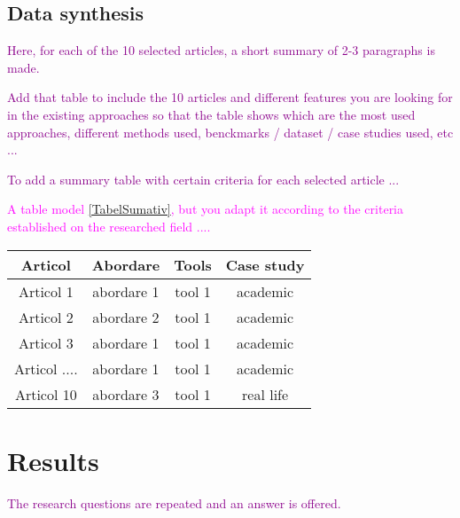 \documentclass[a4paper,fleqn]{cas-dc}
\begin{document}
\subsection{Data synthesis}
\label{SectiuneSintezaArticole}

\textcolor{darkmagenta}{Here, for each of the 10 selected articles, a short summary of 2-3 paragraphs is made.} 


\textcolor{darkmagenta}{Add that table to include the 10 articles and different features you are looking for in the existing approaches so that the table shows which are the most used approaches, different methods used, benckmarks / dataset / case studies used, etc ... } 


\textcolor{darkmagenta}{To add a summary table with certain criteria for each selected article ...} 

\textcolor{magenta}{A table model \ref{TabelSumativ}, but you adapt it according to the criteria established on the researched field ....}

\begin{table*}[h]
\begin{center}
    \begin{tabular}{ |c|c|c|c| } 
    \hline
    \textbf{Articol} & \textbf{Abordare} & \textbf{Tools} & \textbf{Case study}\\
    \hline
    Articol 1 & abordare 1  & tool 1  & academic\\
      \hline
    Articol 2 & abordare 2 & tool 1  & academic\\
      \hline
    Articol 3 & abordare 1 & tool 1  & academic\\
      \hline
    Articol .... & abordare 1 & tool 1  & academic\\
      \hline
    Articol 10 & abordare 3 & tool 1  & real life\\
    \hline
    \end{tabular}
    \end{center}
    \caption{ Tabel sumativ cu abordari }
    \label{TabelSumativ}
\end{table*}    

\section{Results}

\textcolor{darkmagenta}{The research questions are repeated and an answer is offered.}




\end{document}
